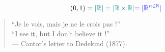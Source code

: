 \begin{frame}{}
  \begin{theorem}[$|\R|$ (1877)]
    \[
      (0,1) = \textcolor{teal}{|\mathbb{R}| = |\mathbb{R} \times \mathbb{R}|} \textcolor{blue}{= |\mathbb{R}^{n \in \mathbb{N}}|}
    \]
  \end{theorem}

  \pause
  \vspace{0.80cm}
  \begin{quote}
    \begin{center}
      ``Je le vois, mais je ne le crois pas !'' \\[8pt]
      ``I see it, but I don't believe it !'' \\[10pt]
      \hfill --- Cantor's letter to Dedekind (1877). 
    \end{center}
  \end{quote}

  \pause
  \vspace{0.60cm}
  \centerline{}
\end{frame}
